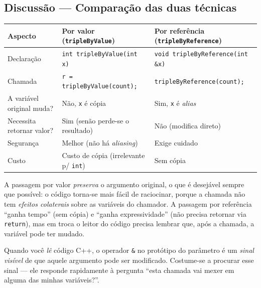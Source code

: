 \documentclass[11pt,a4paper]{article}
\begin{document}
\subsection*{Discuss\~ao --- Compara\c{c}\~ao das duas t\'ecnicas}

\begin{center}
\renewcommand{\arraystretch}{1.4}
\begin{tabular}{|p{4cm}|p{4.8cm}|p{4.8cm}|}
\hline
\textbf{Aspecto} & \textbf{Por valor (\texttt{tripleByValue})} & \textbf{Por refer\^encia (\texttt{tripleByReference})} \\
\hline
Declara\c{c}\~ao         & \texttt{int tripleByValue(int x)} & \texttt{void tripleByReference(int \&x)} \\
Chamada                  & \texttt{r = tripleByValue(count);} & \texttt{tripleByReference(count);} \\
A vari\'avel original muda? & N\~ao, \texttt{x} \'e c\'opia & Sim, \texttt{x} \'e \emph{alias} \\
Necessita retornar valor? & Sim (sen\~ao perde-se o resultado) & N\~ao (modifica direto) \\
Seguran\c{c}a            & Melhor (n\~ao h\'a \emph{aliasing}) & Exige cuidado \\
Custo                    & Custo de c\'opia (irrelevante p/ \texttt{int}) & Sem c\'opia \\
\hline
\end{tabular}
\end{center}

\begin{obseng}
A passagem por valor \emph{preserva} o argumento original, o que \'e desej\'avel sempre que poss\'ivel: o c\'odigo torna-se mais f\'acil de raciocinar, porque a chamada n\~ao tem \emph{efeitos colaterais} sobre as vari\'aveis do chamador. A passagem por refer\^encia ``ganha tempo'' (sem c\'opia) e ``ganha expressividade'' (n\~ao precisa retornar via \texttt{return}), mas em troca o leitor do c\'odigo precisa lembrar que, ap\'os a chamada, a vari\'avel pode ter mudado.
\end{obseng}

\begin{boaprat}
Quando voc\^e \emph{l\^e} c\'odigo C++, o operador \texttt{\&} no prot\'otipo do par\^ametro \'e um \emph{sinal vis\'ivel} de que aquele argumento pode ser modificado. Costume-se a procurar esse sinal --- ele responde rapidamente \`a pergunta ``esta chamada vai mexer em alguma das minhas vari\'aveis?''.
\end{boaprat}
\end{document}
